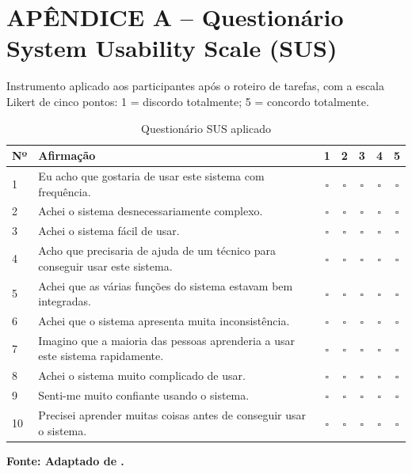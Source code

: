 \section*{APÊNDICE A -- Questionário System Usability Scale (SUS)}

Instrumento aplicado aos participantes após o roteiro de tarefas, com a escala Likert de cinco pontos: 1 = discordo totalmente; 5 = concordo totalmente.

\begin{table}[htbp]
    \centering
    \caption{Questionário SUS aplicado}
    \label{tab:questionario-sus}
    \small
    \begin{tabular}{p{0.8cm}p{8.8cm}ccccc}
        \hline
        \textbf{Nº} & \textbf{Afirmação} & \textbf{1} & \textbf{2} & \textbf{3} & \textbf{4} & \textbf{5} \\
        \hline
        1  & Eu acho que gostaria de usar este sistema com frequência. & $\square$ & $\square$ & $\square$ & $\square$ & $\square$ \\
        2  & Achei o sistema desnecessariamente complexo. & $\square$ & $\square$ & $\square$ & $\square$ & $\square$ \\
        3  & Achei o sistema fácil de usar. & $\square$ & $\square$ & $\square$ & $\square$ & $\square$ \\
        4  & Acho que precisaria de ajuda de um técnico para conseguir usar este sistema. & $\square$ & $\square$ & $\square$ & $\square$ & $\square$ \\
        5  & Achei que as várias funções do sistema estavam bem integradas. & $\square$ & $\square$ & $\square$ & $\square$ & $\square$ \\
        6  & Achei que o sistema apresenta muita inconsistência. & $\square$ & $\square$ & $\square$ & $\square$ & $\square$ \\
        7  & Imagino que a maioria das pessoas aprenderia a usar este sistema rapidamente. & $\square$ & $\square$ & $\square$ & $\square$ & $\square$ \\
        8  & Achei o sistema muito complicado de usar. & $\square$ & $\square$ & $\square$ & $\square$ & $\square$ \\
        9  & Senti-me muito confiante usando o sistema. & $\square$ & $\square$ & $\square$ & $\square$ & $\square$ \\
        10 & Precisei aprender muitas coisas antes de conseguir usar o sistema. & $\square$ & $\square$ & $\square$ & $\square$ & $\square$ \\
        \hline
    \end{tabular}
    \par\vspace{3pt}\textbf{\footnotesize Fonte: Adaptado de .}
\end{table}
